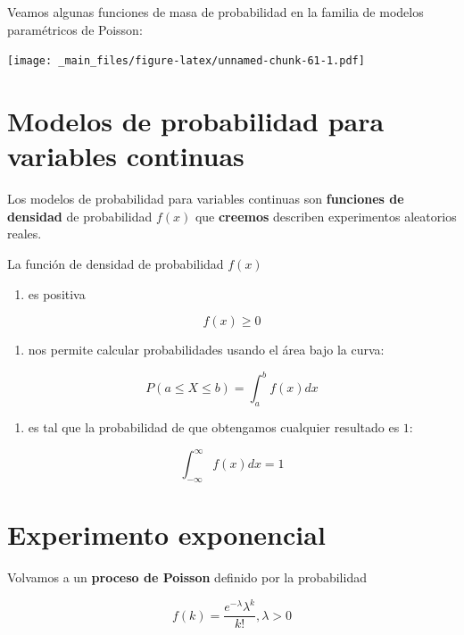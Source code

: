 \documentclass[
]{book}
\providecommand{\tightlist}{%
  \setlength{\itemsep}{0pt}\setlength{\parskip}{0pt}}
\begin{document}
Veamos algunas funciones de masa de probabilidad en la familia de modelos paramétricos de Poisson:

\texttt{[image: \_main\_files/figure-latex/unnamed-chunk-61-1.pdf]}

\hypertarget{modelos-de-probabilidad-para-variables-continuas}{%
\section{Modelos de probabilidad para variables continuas}\label{modelos-de-probabilidad-para-variables-continuas}}

Los modelos de probabilidad para variables continuas son \textbf{funciones de densidad} de probabilidad \(f(x)\) que \textbf{creemos} describen experimentos aleatorios reales.

La función de densidad de probabilidad \(f(x)\)

\begin{enumerate}
\def\labelenumi{\arabic{enumi})}
\tightlist
\item
  es positiva
\end{enumerate}

\[f(x) \geq 0\]

\begin{enumerate}
\def\labelenumi{\arabic{enumi})}
\setcounter{enumi}{1}
\tightlist
\item
  nos permite calcular probabilidades usando el área bajo la curva:
\end{enumerate}

\[P(a\leq X \leq b)=\int_{a}^{b} f(x) dx\]

\begin{enumerate}
\def\labelenumi{\arabic{enumi})}
\setcounter{enumi}{2}
\tightlist
\item
  es tal que la probabilidad de que obtengamos cualquier resultado es \(1\):
\end{enumerate}

\[\int_{-\infty}^{\infty} f(x) dx = 1\]

\hypertarget{experimento-exponencial}{%
\section{Experimento exponencial}\label{experimento-exponencial}}

Volvamos a un \textbf{proceso de Poisson} definido por la probabilidad

\[f(k)=\frac{e^{-\lambda}\lambda^k}{k!}, \lambda>0\]
\end{document}
